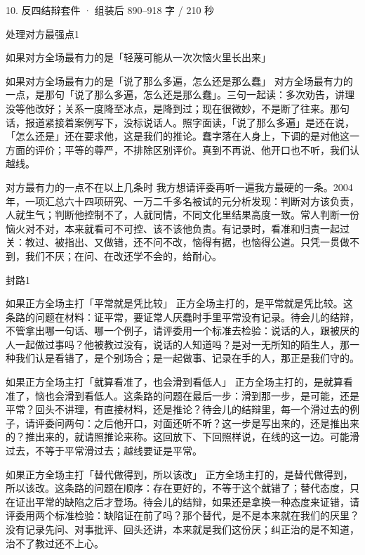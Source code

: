 \documentclass[script,con]{debate}
\begin{document}
\begin{kit}{10. 反四结辩}{套件 · 组装后 890–918 字 / 210 秒}
\begin{pick}{处理对方最强点}{1}
\begin{module}{如果对方全场最有力的是「轻蔑可能从一次次恼火里长出来」}
\end{module}
\begin{module}{如果对方全场最有力的是「说了那么多遍，怎么还是那么蠢」}
对方全场最有力的一点，是那句「说了那么多遍，怎么还是那么蠢」。三句一起读：多次劝告，讲理没等他改好；关系一度降至冰点，是降到过；现在很微妙，不是断了往来。那句话，报道紧接着案例写下，没标说话人。照字面读，「说了那么多遍」是还在说，「怎么还是」还在要求他，这是我们的推论。蠢字落在人身上，下调的是对他这一方面的评价；平等的尊严，不排除区别评价。真到不再说、他开口也不听，我们认越线。
\end{module}
\begin{fallback}{对方最有力的一点不在以上几条时}
我方想请评委再听一遍我方最硬的一条。2004 年，一项汇总六十四项研究、一万二千多名被试的元分析发现：判断对方该负责，人就生气；判断他控制不了，人就同情，不同文化里结果高度一致。常人判断一份恼火对不对，本来就看可不可控、该不该他负责。有记录时，看准和归责一起过关：教过、被指出、又做错，还不问不改，恼得有据，也恼得公道。只凭一贯做不到，我们不厌；在问、在改还学不会的，给耐心。
\end{fallback}
\end{pick}
\begin{pick}{封路}{1}
\begin{module}{如果正方全场主打「平常就是凭比较」}
正方全场主打的，是平常就是凭比较。这条路的问题在材料：证平常，要证常人厌蠢时手里平常没有记录。待会儿的结辩，不管拿出哪一句话、哪一个例子，请评委用一个标准去检验：说话的人，跟被厌的人一起做过事吗？他被教过没有，说话的人知道吗？是对一无所知的陌生人，那一种我们认是看错了，是个别场合；是一起做事、记录在手的人，那正是我们守的。
\end{module}
\begin{module}{如果正方全场主打「就算看准了，也会滑到看低人」}
正方全场主打的，是就算看准了，恼也会滑到看低人。这条路的问题在最后一步：滑到那一步，是可能，还是平常？回头不讲理，有直接材料，还是推论？待会儿的结辩里，每一个滑过去的例子，请评委问两句：之后他开口，对面还听不听？这一步是写出来的，还是推出来的？推出来的，就请照推论来称。这回放下、下回照样说，在线的这一边。可能滑过去，不等于平常滑过去；越线要证是平常。
\end{module}
\begin{module}{如果正方全场主打「替代做得到，所以该改」}
正方全场主打的，是替代做得到，所以该改。这条路的问题在顺序：存在更好的，不等于这个就错了；替代态度，只在证出平常的缺陷之后才登场。待会儿的结辩，如果还是拿换一种态度来证错，请评委用两个标准检验：缺陷证在前了吗？那个替代，是不是本来就在我们的厌里？没有记录先问、对事批评、回头还讲，本来就是我们这份厌；纠正治的是不知道，治不了教过还不上心。

\end{module}
\end{pick}
\end{kit}
\end{document}
